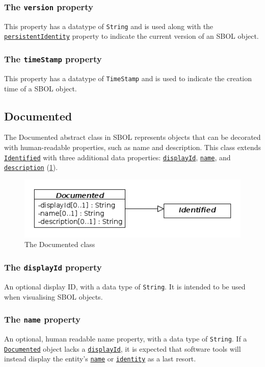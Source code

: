 \documentclass[draftspec]{sbmlpkgspec}
\newcommand{\sbolheading}[1]{\texttt{#1}}
\newcommand{\sbol}[1]{\texttt{\hyperref[sec:#1]{#1}}}
\newcommand{\external}[1]{\texttt{#1}}
\begin{document}
\subsubsection*{The \sbolheading{version} property}
\label{sec:version}
This property has a datatype of \external{String} and is used along with the \sbol{persistentIdentity} property to indicate the current version of an SBOL object.

\subsubsection*{The \sbolheading{timeStamp} property}
\label{sec:timeStamp}
This property has a datatype of \external{TimeStamp} and is used to indicate the creation time of a SBOL object.




\subsection {Documented}
\label{sec:Documented}
The Documented abstract class in SBOL represents objects that can be decorated with human-readable properties, such as name and description. This class extends \sbol{Identified} with three additional data properties: \sbol{displayId}, \sbol{name}, and \sbol{description} (\ref{uml:documented}). 

\begin{figure}[ht]
\begin{center}
\includegraphics[scale=0.6]{uml/documented}
\caption[]{The Documented class}
\label{uml:documented}
\end{center}
\end{figure}

\subsubsection*{The \sbolheading{displayId} property}
\label{sec:displayId}
An optional display ID, with a data type of \external{String}. It is intended to be used when visualising SBOL objects.

\subsubsection*{The \sbolheading{name} property}
\label{sec:name}
An optional, human readable name property, with a data type of \external{String}. If a \sbol{Documented} object lacks a \sbol{displayId}, it is expected that software tools will instead display the entity's \sbol{name} or \sbol{identity} as a last resort.
\end{document}
